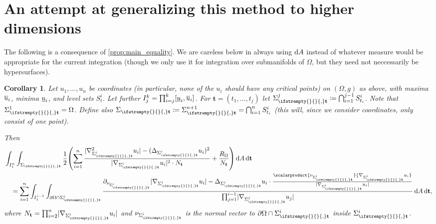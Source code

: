 \documentclass[draft]{amsart}
\newtheorem{corollary}[theorem]{Corollary}
\newcommand*{\mathcomma}{,}
\newcommand*{\mathfullstop}{.}
\DeclarePairedDelimiter{\parens}{(}{)}
\let\p\parens %
\newcommand*{\definedas}{\coloneqq}
\newcommand*{\laplacian}{\Delta}
\newcommand*{\boundary}{\partial}
\DeclarePairedDelimiter{\abs}{\lvert}{\rvert} %
\begin{document}
\section{An attempt at generalizing this method to higher dimensions}
\newcommand{\vect}[1]{\mathbf{#1}}
\newcommand{\nestedLevelSet}[1][]{\Sigma_{\ifstrempty{#1}{}{#1,}\vect{t}}} 
\let\nls\nestedLevelSet
The following is a consequence of \cref{prop:main_equality}. We are careless below in always using \( \odif{A} \) instead of whatever measure would be appropriate for the current integration (though we only use it for integration over submanifolds of \( \Omega \), but they need not neccessarily be hypersurfaces). 
\begin{corollary}\label{cor:higher_dim_main_equality_version}
    Let \( u_1,\dotsc,u_n \) be coordinates (in particular, none of the \( u_i \) should have any critical points) on \( (\Omega,g) \) as above, with maxima \( \overline{u}_i \), minima \( \underline{u}_i \), and level sets \( S_{t}^i  \). Let further \( I_j^k=\prod_{i=j}^{k}\interval{\minu_i}{\maxu_i} \). For \( \vect{t}=(t_1,\dotsc,t_j) \) let \( \nls^j\definedas \bigcap_{i=1}^{j-1} S_{t_i}^i \). Note that \( \nls^1=\Omega \). Define also \( \nls\definedas \nls^{n+1}=\bigcap_{i=1}^n S_{t_i}^i \) (this will, since we consider coordinates, only consist of one point).
    
    Then
    \begin{align*}
        &\int_{I_1^n}\int_{\nls}\frac{1}{2}\p*{\sum_{i=1}^{n}\frac{\abs{\nabla_{\nls^i}^2 u_i}-(\laplacian_{\nls^i}u_i)^2}{\abs{\nabla_{\nls^i}u_i}^2\cdot N_{\vect{t}}}+\frac{R_\Omega}{N_{\vect{t}}}}\odif{A}\odif{\vect{t}}\\
        &\quad=\sum_{i=1}^{n}\int_{I_1^{i-1}}\int_{\boundary{\Omega}\cap \nls^i}\frac{\partial_{\nu_{\nls^i}}\abs{\nabla_{\nls^i}u_i}-\laplacian_{\nls^i}u_i\cdot\frac{\scalarproduct{\nu_{\nls^i}}{\nabla_{\nls^i}u_i}}{\abs{\nabla_{\nls^i}u_i}}}{\prod_{j=1}^{i-1}\abs{\nabla_{\nls^j}u_j}}\odif{A}\odif{\vect{t}}\mathcomma
    \end{align*}
    where \( N_{\vect{t}}=\prod_{i=2}^{n}\abs{\nabla_{\nls^i} u_i} \) and \( \nu_{\nls^i} \) is the normal vector to \( \boundary{\Omega}\cap \nls^i \) inside \( \nls^{i} \).

\end{corollary}
\end{document}
